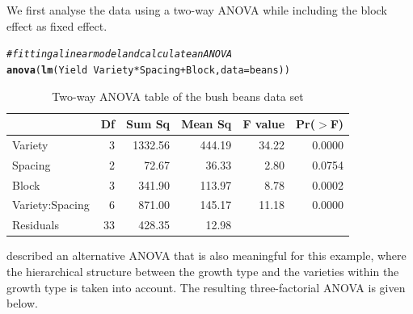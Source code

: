 \documentclass[12pt]{article}\usepackage[]{graphicx}\usepackage[]{color}
\makeatletter
\newcommand{\hlcom}[1]{\textcolor[rgb]{0.678,0.584,0.686}{\textit{#1}}}%
\newcommand{\hlopt}[1]{\textcolor[rgb]{0,0,0}{#1}}%
\newcommand{\hlstd}[1]{\textcolor[rgb]{0.345,0.345,0.345}{#1}}%
\newcommand{\hlkwc}[1]{\textcolor[rgb]{0.333,0.667,0.333}{#1}}%
\newcommand{\hlkwd}[1]{\textcolor[rgb]{0.737,0.353,0.396}{\textbf{#1}}}%
\newenvironment{kframe}{%
 \def\at@end@of@kframe{}%
 \ifinner\ifhmode%
  \def\at@end@of@kframe{\end{minipage}}%
  \begin{minipage}{\columnwidth}%
 \fi\fi%
 \def\FrameCommand##1{\hskip\@totalleftmargin \hskip-\fboxsep
 \colorbox{shadecolor}{##1}\hskip-\fboxsep
     \hskip-\linewidth \hskip-\@totalleftmargin \hskip\columnwidth}%
 \MakeFramed {\advance\hsize-\width
   \@totalleftmargin\z@ \linewidth\hsize
   \@setminipage}}%
 {\par\unskip\endMakeFramed%
 \at@end@of@kframe}
\newenvironment{knitrout}{}{} %
\makeatother
\begin{document}
We first analyse the data using a two-way ANOVA while including the block effect as fixed effect.




\begin{knitrout}
\color{fgcolor}\begin{kframe}
\begin{alltt}
\hlcom{# fitting a linear model and calculate an ANOVA}
\hlkwd{anova}\hlstd{(}\hlkwd{lm}\hlstd{(Yield} \hlopt{~} \hlstd{Variety} \hlopt{*} \hlstd{Spacing} \hlopt{+} \hlstd{Block,} \hlkwc{data} \hlstd{= beans))}
\end{alltt}
\end{kframe}
\end{knitrout}


\begin{table}[ht]
\centering
\begin{tabular}{lrrrrr}
  \hline
 & Df & Sum Sq & Mean Sq & F value & Pr($>$F) \\ 
  \hline
Variety & 3 & 1332.56 & 444.19 & 34.22 & 0.0000 \\ 
  Spacing & 2 & 72.67 & 36.33 & 2.80 & 0.0754 \\ 
  Block & 3 & 341.90 & 113.97 & 8.78 & 0.0002 \\ 
  Variety:Spacing & 6 & 871.00 & 145.17 & 11.18 & 0.0000 \\ 
  Residuals & 33 & 428.35 & 12.98 &  &  \\ 
   \hline
\end{tabular}
\caption{Two-way ANOVA table of the bush beans data set} 
\end{table}




\cite{Kitsche.2014} described an alternative ANOVA that is also meaningful for this example, where the hierarchical structure between the growth type and the varieties within the growth type is taken into account. The resulting three-factorial ANOVA is given below.
\end{document}
